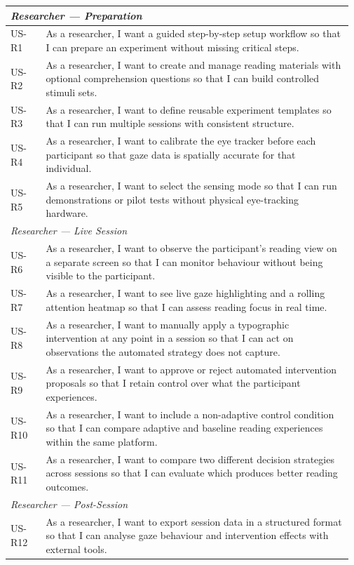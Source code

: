 \begin{longtable}{@{} p{0.10\linewidth} p{0.87\linewidth} @{}}
\multicolumn{2}{l}{\textit{Researcher --- Preparation}} \\
\midrule
US-R1  & As a researcher, I want a guided step-by-step setup workflow so that I can prepare an experiment without missing critical steps. \\[2pt]
US-R2  & As a researcher, I want to create and manage reading materials with optional comprehension questions so that I can build controlled stimuli sets. \\[2pt]
US-R3  & As a researcher, I want to define reusable experiment templates so that I can run multiple sessions with consistent structure. \\[2pt]
US-R4  & As a researcher, I want to calibrate the eye tracker before each participant so that gaze data is spatially accurate for that individual. \\[2pt]
US-R5  & As a researcher, I want to select the sensing mode so that I can run demonstrations or pilot tests without physical eye-tracking hardware. \\
\midrule
\multicolumn{2}{l}{\textit{Researcher --- Live Session}} \\
\midrule
US-R6  & As a researcher, I want to observe the participant's reading view on a separate screen so that I can monitor behaviour without being visible to the participant. \\[2pt]
US-R7  & As a researcher, I want to see live gaze highlighting and a rolling attention heatmap so that I can assess reading focus in real time. \\[2pt]
US-R8  & As a researcher, I want to manually apply a typographic intervention at any point in a session so that I can act on observations the automated strategy does not capture. \\[2pt]
US-R9  & As a researcher, I want to approve or reject automated intervention proposals so that I retain control over what the participant experiences. \\[2pt]
US-R10 & As a researcher, I want to include a non-adaptive control condition so that I can compare adaptive and baseline reading experiences within the same platform. \\[2pt]
US-R11 & As a researcher, I want to compare two different decision strategies across sessions so that I can evaluate which produces better reading outcomes. \\[2pt]
\midrule
\multicolumn{2}{l}{\textit{Researcher --- Post-Session}} \\
\midrule
US-R12 & As a researcher, I want to export session data in a structured format so that I can analyse gaze behaviour and intervention effects with external tools. \\[2pt]

\end{longtable}
